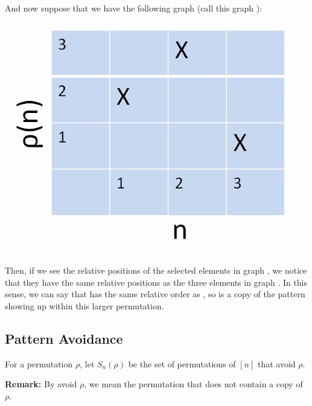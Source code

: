 \documentclass[letterpaper]{article}
\begin{document}
And now suppose that we have the following graph (call this graph ):
\begin{center}
    \includegraphics[scale=0.45]{img/pattern_perm.PNG}
\end{center}
Then, if we see the relative positions of the selected elements in graph , we notice that they have the same relative positions as the three elements in graph . In this sense, we can say that  has the same relative order as , so  is a copy of the pattern  showing up within this larger permutation. 

\subsection{Pattern Avoidance}
\begin{definition}{}{}
    For a permutation $\rho$, let $S_{n}(\rho)$ be the set of permutations of $[n]$ that avoid $\rho$. 
\end{definition}
\textbf{Remark:} By avoid $\rho$, we mean the permutation that does not contain a copy of $\rho$. 
\end{document}
